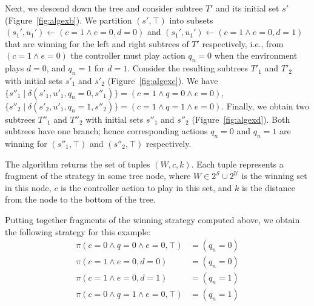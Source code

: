 Next, we descend down the tree and consider subtree $T'$ and its initial set $s'$ (Figure~\ref{fig:algexb}).  We partition $(s', \top)$ into subsets $(s_1', u_1') \gets (c = 1 \land e = 0, d = 0)$ and $(s_1', u_1') \gets (c = 1 \land e = 0, d = 1)$ that are winning for the left and right subtrees of $T'$ respectively, i.e., from $(c = 1 \land e = 0)$ the controller must play action $q_n = 0$ when the environment plays $d = 0$, and $q_n = 1$ for $d = 1$.  Consider the resulting subtrees $T'_1$ and $T'_2$ with initial sets $s'_1$ and $s'_2$ (Figure~\ref{fig:algexc}).  We have $\{ s''_1 \mid \delta(s'_1, u'_1, q_n = 0, s''_1) \} = (c = 1 \land q = 0 \land e = 0)$, $\{ s''_2 \mid \delta(s'_2, u'_1, q_n = 1, s''_2) \} = (c = 1 \land q = 1 \land e = 0)$.  Finally, we obtain two subtrees $T''_1$ and $T''_2$ with initial sets $s''_1$ and $s''_2$ (Figure~\ref{fig:algexd}).  Both subtrees have one branch; hence corresponding actions $q_n = 0$ and $q_n = 1$ are winning for $(s''_1, \top)$ and $(s''_2, \top)$ respectively.

The algorithm returns the set of tuples $(W, c, k)$.  Each tuple represents a fragment of the strategy in some tree node, where $W \in 2^{\mathcal{S}} \cup 2^{\mathcal{U}}$ is the winning set in this node, $c$ is the controller action to play in this set, and $k$ is the distance from the node to the bottom of the tree.

Putting together fragments of the winning strategy computed above, we obtain the following strategy for this example:
\begin{align*}
    \pi(c = 0 \land q = 0 \land e = 0, \top) &= (q_n = 0) \\
    \pi(c = 1 \land e = 0, d = 0) &= (q_n = 0) \\
    \pi(c = 1 \land e = 0, d = 1) &= (q_n = 1) \\
    \pi(c = 0 \land q = 1 \land e = 0, \top) &= (q_n = 1)
\end{align*}





